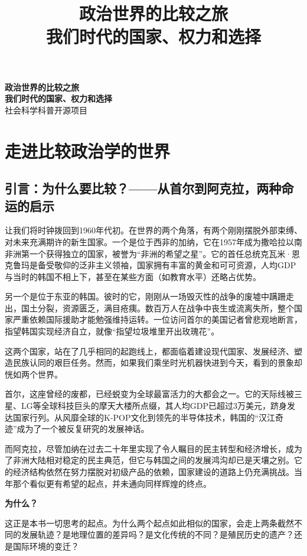 \documentclass[a5paper, 11pt, openany]{ctexbook}
\title{
    {\Huge\bfseries\songti 政治世界的比较之旅}\\[1cm]
    {\LARGE\songti 我们时代的国家、权力和选择}
}
\author{} %
\date{}   %
\newcommand{\publisher}{社会科学科普开源项目} %
\renewcommand{\maketitle}{
    \begin{titlepage}
        \thispagestyle{empty} %
        \centering
        \vspace*{\stretch{1.5}}
        {\huge\bfseries\songti 政治世界的比较之旅}\\[1cm]
        {\large\bfseries\songti 我们时代的国家、权力和选择}\\[1cm] %

        \vfill %
        {\large \publisher} %
    \end{titlepage}
}
\begin{document}
\frontmatter %
\pagestyle{fancy} %
\maketitle
\tableofcontents

\mainmatter %
\pagestyle{fancy} %

\part{走进比较政治学的世界}

\chapter{引言：为什么要比较？——从首尔到阿克拉，两种命运的启示}

让我们将时钟拨回到1960年代初。在世界的两个角落，有两个刚刚摆脱外部束缚、对未来充满期许的新生国家。一个是位于西非的加纳，它在1957年成为撒哈拉以南非洲第一个获得独立的国家，被誉为“非洲的希望之星”。它的首任总统克瓦米·恩克鲁玛是备受敬仰的泛非主义领袖，国家拥有丰富的黄金和可可资源，人均GDP与当时的韩国不相上下，甚至在某些方面（如教育水平）还略占优势。

另一个是位于东亚的韩国。彼时的它，刚刚从一场毁灭性的战争的废墟中蹒跚走出，国土分裂，资源匮乏，满目疮痍。数百万人在战争中丧生或流离失所，整个国家严重依赖国际援助才能勉强维持运转。一位访问首尔的美国记者曾悲观地断言，指望韩国实现经济自立，就像“指望垃圾堆里开出玫瑰花”。

这两个国家，站在了几乎相同的起跑线上，都面临着建设现代国家、发展经济、塑造民族认同的艰巨任务。然而，如果我们乘坐时光机器快进到今天，看到的景象却恍如两个世界。

首尔，这座曾经的废都，已经蜕变为全球最富活力的大都会之一。它的天际线被三星、LG等全球科技巨头的摩天大楼所点缀，其人均GDP已超过3万美元，跻身发达国家行列。从风靡全球的K-POP文化到领先的半导体技术，韩国的“汉江奇迹”成为了一个被反复研究的发展神话。

而阿克拉，尽管加纳在过去二十年里实现了令人瞩目的民主转型和经济增长，成为了非洲大陆相对稳定的民主典范，但它与韩国之间的发展鸿沟却已是天壤之别。它的经济结构依然在努力摆脱对初级产品的依赖，国家建设的道路上仍充满挑战。当年那个看似更有希望的起点，并未通向同样辉煌的终点。

\textbf{为什么？}

这正是本书一切思考的起点。为什么两个起点如此相似的国家，会走上两条截然不同的发展轨迹？是地理位置的差异吗？是文化传统的不同？是殖民历史的遗产？还是国际环境的变迁？
\end{document}
